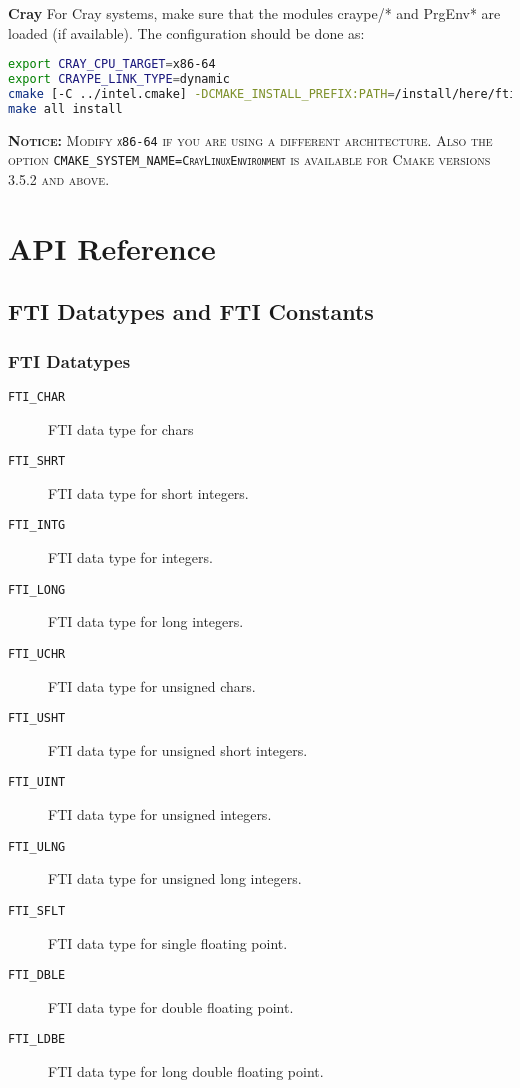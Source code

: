 \documentclass{refrep}
\begin{document}
\vspace{2mm}
{\bf Cray}
For Cray systems, make sure that the modules craype/* and PrgEnv* are loaded (if available). The configuration should be done as:
\begin{lstlisting}[language=bash]
export CRAY_CPU_TARGET=x86-64
export CRAYPE_LINK_TYPE=dynamic
cmake [-C ../intel.cmake] -DCMAKE_INSTALL_PREFIX:PATH=/install/here/fti -DCMAKE_SYSTEM_NAME=CrayLinuxEnvironment ..
make all install
\end{lstlisting}
\begin{tcolorbox}
    \textsc{{\bf Notice:} Modify {\tt x86-64} if you are using a different architecture. Also the option {\tt CMAKE\_SYSTEM\_NAME=CrayLinuxEnvironment} is available for Cmake versions 3.5.2 and above.}
\end{tcolorbox}









\chapter{API Reference}\label{ch:apireference}
\section{FTI Datatypes and FTI Constants}\label{sec:datatypesandconstants}
\subsection{FTI Datatypes}\label{sec:datatypes}
\begin{description}
\item[\tt{FTI\_CHAR}] FTI data type for chars
\item[\tt{FTI\_SHRT}] FTI data type for short integers.
\item[\tt{FTI\_INTG}] FTI data type for integers.
\item[\tt{FTI\_LONG}] FTI data type for long integers.
\item[\tt{FTI\_UCHR}] FTI data type for unsigned chars.
\item[\tt{FTI\_USHT}] FTI data type for unsigned short integers.
\item[\tt{FTI\_UINT}] FTI data type for unsigned integers.
\item[\tt{FTI\_ULNG}] FTI data type for unsigned long integers.
\item[\tt{FTI\_SFLT}] FTI data type for single floating point.
\item[\tt{FTI\_DBLE}] FTI data type for double floating point.
\item[\tt{FTI\_LDBE}] FTI data type for long double floating point.
\end{description}
\end{document}
